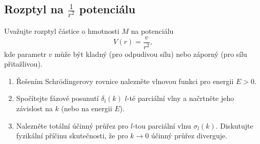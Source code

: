 \subsection{Rozptyl na $\frac{1}{r^{2}}$ potenciálu}
Uvažujte rozptyl částice o hmotnosti $M$ na potenciálu
\begin{equation}
    \label{eq:1r2PotentialV}
	V(r)=\frac{v}{r^{2}},
\end{equation}
kde parametr $v$ může být kladný (pro odpudivou sílu) nebo záporný (pro sílu přitažlivou).

\begin{enumerate}
	\item 
		Řešením Schrödingerovy rovnice nalezněte vlnovou funkci pro energii $E>0$.
		
	\item
		Spočítejte fázové posunutí $\delta_{l}(k)$ $l$-té parciální vlny 
		a načrtněte jeho závislost na $k$ (nebo na energii $E$).
		
	\item
		Nalezněte totální účinný průřez pro $l$-tou parciální vlnu $\sigma_{l}(k)$.
		Diskutujte fyzikální příčinu skutečnosti, že pro $k\rightarrow0$ účinný průřez diverguje.
\end{enumerate}

